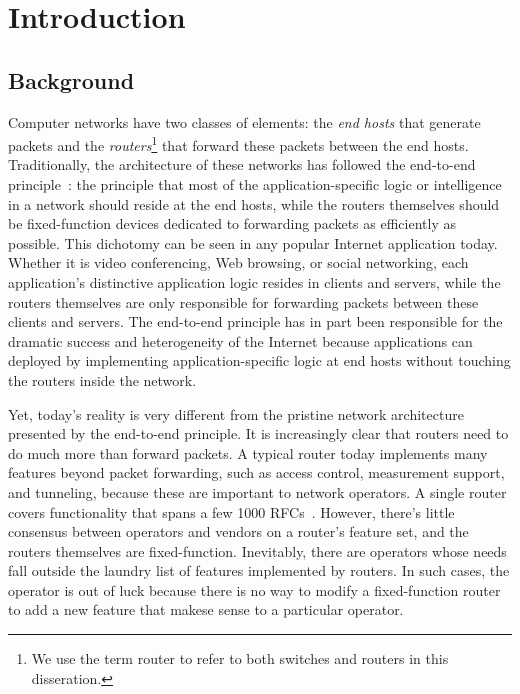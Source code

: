 \chapter{Introduction}
\label{chap:intro}

\section{Background}
Computer networks have two classes of elements: the \textit{end hosts} that
generate packets and the \textit{routers}\footnote{We use the term router to
refer to both switches and routers in this disseration.} that forward these
packets between the end hosts. Traditionally, the architecture of these
networks has followed the end-to-end principle~\cite{e2e}: the principle that
most of the application-specific logic or intelligence in a network should
reside at the end hosts, while the routers themselves should be fixed-function
devices dedicated to forwarding packets as efficiently as possible. This
dichotomy can be seen in any popular Internet application today. Whether it is
video conferencing, Web browsing, or social networking, each application's
distinctive application logic resides in clients and servers, while the routers
themselves are only responsible for forwarding packets between these clients
and servers. The end-to-end principle has in part been responsible for the
dramatic success and heterogeneity of the Internet because applications can
deployed by implementing application-specific logic at end hosts without
touching the routers inside the network.

Yet, today's reality is very different from the pristine network architecture
presented by the end-to-end principle. It is increasingly clear that routers
need to do much more than forward packets. A typical router today implements
many features beyond packet forwarding, such as access control, measurement
support, and tunneling, because these are important to network operators. A
single router covers functionality that spans a few 1000
RFCs~\cite{lavanya_compiler}. However, there's little consensus between
operators and vendors on a router's feature set, and the routers themselves are
fixed-function. Inevitably, there are operators whose needs fall outside the
laundry list of features implemented by routers. In such cases, the operator is
out of luck because there is no way to modify a fixed-function router to add a
new feature that makese sense to a particular operator.

